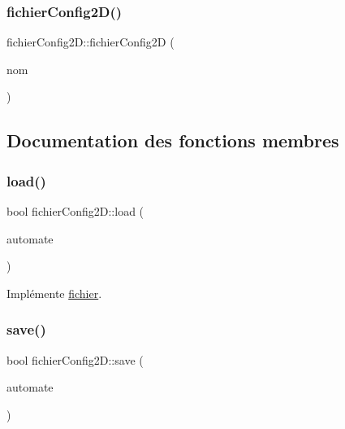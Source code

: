 \subsubsection{\texorpdfstring{fichier\+Config2\+D()}{fichierConfig2D()}}
{\footnotesize\ttfamily fichier\+Config2\+D\+::fichier\+Config2D (\begin{DoxyParamCaption}\item[{const std\+::string}]{nom }\end{DoxyParamCaption})\hspace{0.3cm}{\ttfamily [inline]}}



\subsection{Documentation des fonctions membres}
\mbox{\label{classfichier_config2_d_a90761ac1866815bd59b0f1730ce6bd5f}} 
\subsubsection{\texorpdfstring{load()}{load()}}
{\footnotesize\ttfamily bool fichier\+Config2\+D\+::load (\begin{DoxyParamCaption}\item[{const \mbox{\hyperlink{class_cellular_automata}{Cellular\+Automata}} $\ast$}]{automate }\end{DoxyParamCaption})\hspace{0.3cm}{\ttfamily [virtual]}}



Implémente \mbox{\hyperlink{classfichier_a6c246db929cf6532eb3f12c2b39574d5}{fichier}}.

\mbox{\label{classfichier_config2_d_ac91d6cd20fd9edc6ed71684b8d5a1b40}} 
\subsubsection{\texorpdfstring{save()}{save()}}
{\footnotesize\ttfamily bool fichier\+Config2\+D\+::save (\begin{DoxyParamCaption}\item[{const \mbox{\hyperlink{class_cellular_automata}{Cellular\+Automata}} \&}]{automate }\end{DoxyParamCaption})\hspace{0.3cm}{\ttfamily [virtual]}}



